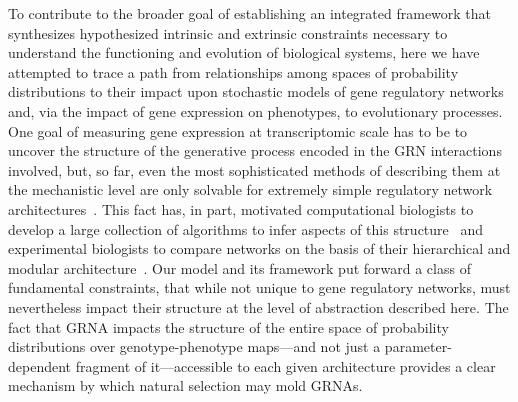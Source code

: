 To contribute to the broader goal of establishing an integrated framework that synthesizes hypothesized intrinsic and extrinsic constraints necessary to understand the functioning and evolution of biological systems, here we have attempted to trace a path from relationships among spaces of probability distributions to their impact upon stochastic models of gene regulatory networks and, via the impact of gene expression on phenotypes, to evolutionary processes. One goal of measuring gene expression at transcriptomic scale has to be to uncover the structure of the generative process encoded in the GRN interactions involved, but, so far, even the most sophisticated methods of describing them at the mechanistic level are only solvable for extremely simple regulatory network architectures~\cite{Walczak2009,Mugler2009}. This fact has, in part, motivated computational biologists to develop a large collection of algorithms to infer aspects of this structure~\cite{DeSmet2010} and experimental biologists to compare networks on the basis of their hierarchical and modular architecture~\cite{Ideker2012}. Our model and its framework put forward a class of fundamental constraints, that while not unique to gene regulatory networks, must nevertheless impact their structure at the level of abstraction described here. The fact that GRNA impacts the structure of the entire space of probability distributions over genotype-phenotype maps---and not just a parameter-dependent fragment of it---accessible to each given architecture provides a clear mechanism by which natural selection may mold GRNAs.


